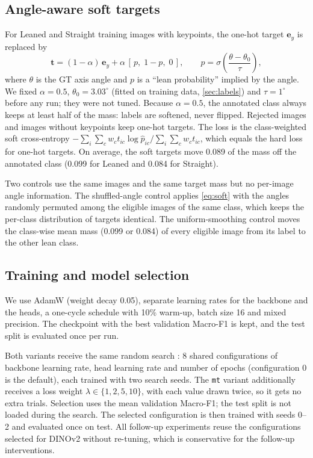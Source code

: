 \documentclass[11pt]{article}
\newcommand{\mt}{\texttt{mt}}
\begin{document}
\subsection{Angle-aware soft targets}
\label{sec:softtargets}
For Leaned and Straight training images with keypoints, the one-hot target $\mathbf{e}_y$ is replaced by
\begin{equation}
  \mathbf{t} = (1-\alpha)\,\mathbf{e}_y + \alpha\,[\,p,\; 1-p,\; 0\,], \qquad
  p = \sigma\!\left(\frac{\theta - \theta_0}{\tau}\right),
  \label{eq:soft}
\end{equation}
where $\theta$ is the GT axis angle and $p$ is a ``lean probability'' implied by the angle. We fixed
$\alpha = 0.5$, $\theta_0 = 3.03^\circ$ (fitted on training data, \cref{sec:labels}) and $\tau = 1^\circ$
before any run; they were not tuned. Because $\alpha = 0.5$, the annotated class always keeps at least half of
the mass: labels are softened, never flipped. Rejected images and images without keypoints keep one-hot
targets. The loss is the class-weighted soft cross-entropy
$-\sum_i \sum_c w_c t_{ic} \log \hat{p}_{ic} / \sum_i \sum_c w_c t_{ic}$, which equals the hard loss for
one-hot targets. On average, the soft targets move 0.089 of the mass off the annotated class (0.099 for
Leaned and 0.084 for Straight).

Two controls use the same images and the same target mass but no per-image angle information. The
shuffled-angle control applies \cref{eq:soft} with the angles randomly permuted among the eligible images of
the same class, which keeps the per-class distribution of targets identical. The uniform-smoothing control moves
the class-wise mean mass (0.099 or 0.084) of every eligible image from its label to the other lean class.

\subsection{Training and model selection}
We use AdamW \citep{loshchilov2019adamw} (weight decay 0.05), separate learning rates for the backbone and the
heads, a one-cycle schedule \citep{smith2019superconvergence} with 10\% warm-up, batch size 16 and mixed
precision. The checkpoint with the best validation Macro-F1 is kept, and the test split is evaluated once per
run.

Both variants receive the same random search \citep{bergstra2012random}: 8 shared configurations of backbone
learning rate, head learning rate and number of epochs (configuration 0 is the default), each trained with two
search seeds. The \mt{} variant additionally receives a loss weight $\lambda \in \{1, 2, 5, 10\}$, with each
value drawn twice, so it gets no extra trials. Selection uses the mean validation Macro-F1; the test split is
not loaded during the search. The selected configuration is then trained with seeds 0--2 and evaluated once on
test. All follow-up experiments reuse the configurations selected for DINOv2 without re-tuning, which is
conservative for the follow-up interventions.
\end{document}
